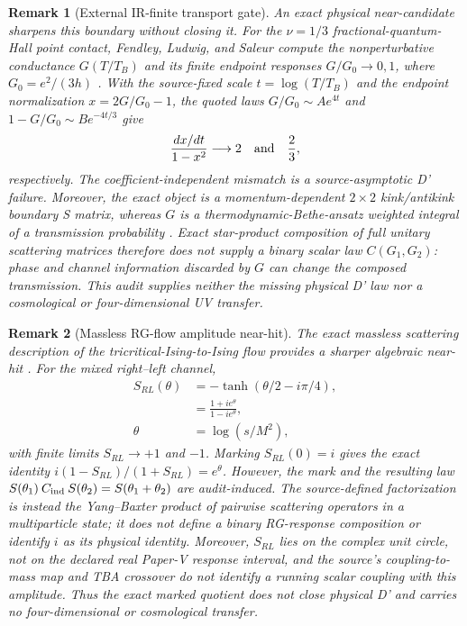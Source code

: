 \documentclass[aps,prd,twocolumn,superscriptaddress,nofootinbib]{revtex4-2}
\newtheorem{remark}{Remark}
\begin{document}
\begin{remark}[External IR-finite transport gate]
An exact physical near-candidate sharpens this boundary without closing it. For the $\nu=1/3$ fractional-quantum-Hall point contact, Fendley, Ludwig, and Saleur compute the nonperturbative conductance $G(T/T_B)$ and its finite endpoint responses $G/G_0\to0,1$, where $G_0=e^2/(3h)$ \cite{FendleyLudwigSaleur1995}. With the source-fixed scale $t=\log(T/T_B)$ and the endpoint normalization $x=2G/G_0-1$, the quoted laws $G/G_0\sim A e^{4t}$ and $1-G/G_0\sim B e^{-4t/3}$ give
\[
 \frac{dx/dt}{1-x^2}\longrightarrow 2
 \quad\hbox{and}\quad
 \frac{2}{3},
\]
respectively. The coefficient-independent mismatch is a source-asymptotic D' failure. Moreover, the exact object is a momentum-dependent $2\times2$ kink/antikink boundary S matrix, whereas $G$ is a thermodynamic-Bethe-ansatz weighted integral of a transmission probability \cite{GhoshalZamolodchikov1994,FendleyLudwigSaleur1995}. Exact star-product composition of full unitary scattering matrices \cite{KostrykinSchrader2001} therefore does not supply a binary scalar law $C(G_1,G_2)$: phase and channel information discarded by $G$ can change the composed transmission. This audit supplies neither the missing physical D' law nor a cosmological or four-dimensional UV transfer.
\end{remark}

\begin{remark}[Massless RG-flow amplitude near-hit]
The exact massless scattering description of the tricritical-Ising-to-Ising flow provides a sharper algebraic near-hit \cite{FendleySaleurZamolodchikov1993}. For the mixed right--left channel,
\[
 \begin{aligned}
 S_{RL}(\theta)&=-\tanh(\theta/2-i\pi/4),\\
                &=\frac{1+i e^\theta}{1-i e^\theta},\\
 \theta&=\log(s/M^2),
 \end{aligned}
\]
with finite limits $S_{RL}\to+1$ and $-1$. Marking $S_{RL}(0)=i$ gives the exact identity $i(1-S_{RL})/(1+S_{RL})=e^\theta$. However, the mark and the resulting law $S(\theta_1)\mathbin{C}_{\rm ind}S(\theta_2)=S(\theta_1+\theta_2)$ are audit-induced. The source-defined factorization is instead the Yang--Baxter product of pairwise scattering operators in a multiparticle state; it does not define a binary RG-response composition or identify $i$ as its physical identity. Moreover, $S_{RL}$ lies on the complex unit circle, not on the declared real Paper-V response interval, and the source's coupling-to-mass map and TBA crossover do not identify a running scalar coupling with this amplitude. Thus the exact marked quotient does not close physical D' and carries no four-dimensional or cosmological transfer.
\end{remark}
\end{document}
